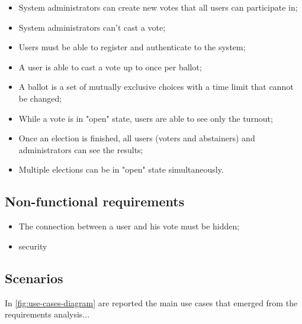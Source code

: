 \documentclass{scrartcl}
\begin{document}
\begin{itemize}
    \item System administrators can create new votes that all users can participate in;
    \item System administrators can't cast a vote;
    \item Users must be able to register and authenticate to the system;
    \item A user is able to cast a vote up to once per ballot;
    \item A ballot is a set of mutually exclusive choices with a time limit that cannot be changed;
    \item While a vote is in "open" state, users are able to see only the turnout;
    \item Once an election is finished, all users (voters and abstainers) and administrators can
    see the results;
    \item Multiple elections can be in "open" state simultaneously.
\end{itemize}

\subsection*{Non-functional requirements}

\begin{itemize}
    \item The connection between a user and his vote must be hidden;
    \item security 
\end{itemize}

\subsection{Scenarios}


In \cref{fig:use-cases-diagram} are reported the main use cases that emerged from the requirements analysis...
\end{document}
